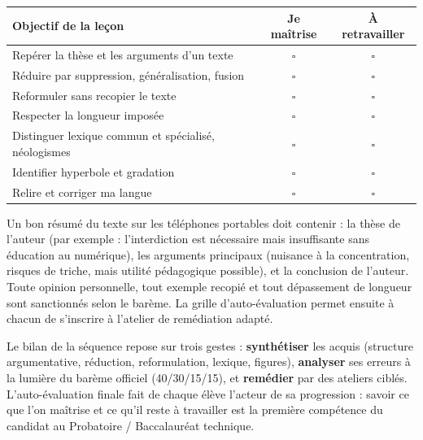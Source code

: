 \documentclass[11pt]{article}
\begin{document}
\begin{center}
\begin{tabularx}{\linewidth}{|X|c|c|}
\hline
\rowcolor{popblueL} \textbf{Objectif de la leçon} & \textbf{Je maîtrise} & \textbf{À retravailler} \\
\hline
Repérer la thèse et les arguments d'un texte & $\square$ & $\square$ \\
\hline
Réduire par suppression, généralisation, fusion & $\square$ & $\square$ \\
\hline
Reformuler sans recopier le texte & $\square$ & $\square$ \\
\hline
Respecter la longueur imposée & $\square$ & $\square$ \\
\hline
Distinguer lexique commun et spécialisé, néologismes & $\square$ & $\square$ \\
\hline
Identifier hyperbole et gradation & $\square$ & $\square$ \\
\hline
Relire et corriger ma langue & $\square$ & $\square$ \\
\hline
\end{tabularx}
\end{center}

\begin{corrige}
Un bon résumé du texte sur les téléphones portables doit contenir : la thèse de l'auteur (par exemple : l'interdiction est nécessaire mais insuffisante sans éducation au numérique), les arguments principaux (nuisance à la concentration, risques de triche, mais utilité pédagogique possible), et la conclusion de l'auteur. Toute opinion personnelle, tout exemple recopié et tout dépassement de longueur sont sanctionnés selon le barème. La grille d'auto-évaluation permet ensuite à chacun de s'inscrire à l'atelier de remédiation adapté.
\end{corrige}

\begin{aretenir}
Le bilan de la séquence repose sur trois gestes : \textbf{synthétiser} les acquis (structure argumentative, réduction, reformulation, lexique, figures), \textbf{analyser} ses erreurs à la lumière du barème officiel (40/30/15/15), et \textbf{remédier} par des ateliers ciblés. L'auto-évaluation finale fait de chaque élève l'acteur de sa progression : savoir ce que l'on maîtrise et ce qu'il reste à travailler est la première compétence du candidat au Probatoire / Baccalauréat technique.
\end{aretenir}
\end{document}

